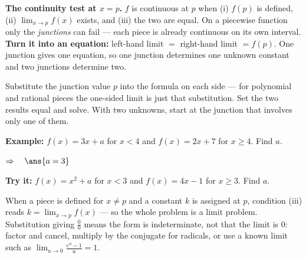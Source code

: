 \documentclass[12pt]{article}
\begin{document}

\begin{formulabox}
\textbf{The continuity test at $x = p$.} $f$ is continuous at $p$ when
(i) $f(p)$ is defined, (ii) $\lim_{x \to p} f(x)$ exists, and (iii) the two are
equal. On a piecewise function only the \emph{junctions} can fail --- each
piece is already continuous on its own interval.\\[3pt]
\textbf{Turn it into an equation:} left-hand limit $=$ right-hand limit
$= f(p)$. One junction gives one equation, so one junction determines one
unknown constant and two junctions determine two.
\end{formulabox}


\begin{formulabox}
Substitute the junction value $p$ into the formula on each side --- for
polynomial and rational pieces the one-sided limit is just that substitution.
Set the two results equal and solve. With two unknowns, start at the junction
that involves only one of them.
\end{formulabox}

\begin{examplebox}
\textbf{Example:} $f(x) = 3x + a$ for $x < 4$ and $f(x) = 2x + 7$ for
$x \geq 4$. Find $a$.

$\Rightarrow\quad \ans{a = 3}$
\end{examplebox}

\begin{tryitbox}
\textbf{Try it:} $f(x) = x^2 + a$ for $x < 3$ and $f(x) = 4x - 1$ for
$x \geq 3$. Find $a$.\\[2pt]
\end{tryitbox}


\begin{formulabox}
When a piece is defined for $x \neq p$ and a constant $k$ is assigned at $p$,
condition (iii) reads $k = \lim_{x \to p} f(x)$ --- so the whole problem is a
limit problem.\\[3pt]
Substitution giving $\frac{0}{0}$ means the form is indeterminate, not that the
limit is $0$: factor and cancel, multiply by the conjugate for radicals, or use
a known limit such as $\lim_{u \to 0} \frac{e^u - 1}{u} = 1$.
\end{formulabox}
\end{document}
